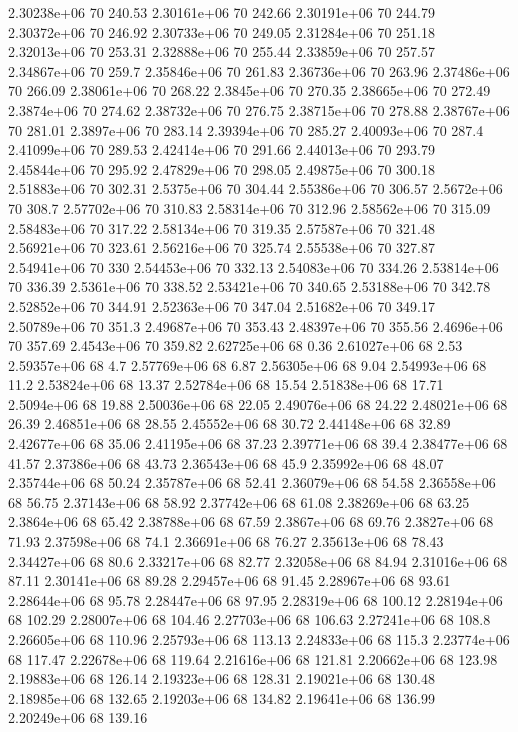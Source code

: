 2.30238e+06 70 240.53
2.30161e+06 70 242.66
2.30191e+06 70 244.79
2.30372e+06 70 246.92
2.30733e+06 70 249.05
2.31284e+06 70 251.18
2.32013e+06 70 253.31
2.32888e+06 70 255.44
2.33859e+06 70 257.57
2.34867e+06 70 259.7
2.35846e+06 70 261.83
2.36736e+06 70 263.96
2.37486e+06 70 266.09
2.38061e+06 70 268.22
2.3845e+06 70 270.35
2.38665e+06 70 272.49
2.3874e+06 70 274.62
2.38732e+06 70 276.75
2.38715e+06 70 278.88
2.38767e+06 70 281.01
2.3897e+06 70 283.14
2.39394e+06 70 285.27
2.40093e+06 70 287.4
2.41099e+06 70 289.53
2.42414e+06 70 291.66
2.44013e+06 70 293.79
2.45844e+06 70 295.92
2.47829e+06 70 298.05
2.49875e+06 70 300.18
2.51883e+06 70 302.31
2.5375e+06 70 304.44
2.55386e+06 70 306.57
2.5672e+06 70 308.7
2.57702e+06 70 310.83
2.58314e+06 70 312.96
2.58562e+06 70 315.09
2.58483e+06 70 317.22
2.58134e+06 70 319.35
2.57587e+06 70 321.48
2.56921e+06 70 323.61
2.56216e+06 70 325.74
2.55538e+06 70 327.87
2.54941e+06 70 330
2.54453e+06 70 332.13
2.54083e+06 70 334.26
2.53814e+06 70 336.39
2.5361e+06 70 338.52
2.53421e+06 70 340.65
2.53188e+06 70 342.78
2.52852e+06 70 344.91
2.52363e+06 70 347.04
2.51682e+06 70 349.17
2.50789e+06 70 351.3
2.49687e+06 70 353.43
2.48397e+06 70 355.56
2.4696e+06 70 357.69
2.4543e+06 70 359.82
2.62725e+06 68 0.36
2.61027e+06 68 2.53
2.59357e+06 68 4.7
2.57769e+06 68 6.87
2.56305e+06 68 9.04
2.54993e+06 68 11.2
2.53824e+06 68 13.37
2.52784e+06 68 15.54
2.51838e+06 68 17.71
2.5094e+06 68 19.88
2.50036e+06 68 22.05
2.49076e+06 68 24.22
2.48021e+06 68 26.39
2.46851e+06 68 28.55
2.45552e+06 68 30.72
2.44148e+06 68 32.89
2.42677e+06 68 35.06
2.41195e+06 68 37.23
2.39771e+06 68 39.4
2.38477e+06 68 41.57
2.37386e+06 68 43.73
2.36543e+06 68 45.9
2.35992e+06 68 48.07
2.35744e+06 68 50.24
2.35787e+06 68 52.41
2.36079e+06 68 54.58
2.36558e+06 68 56.75
2.37143e+06 68 58.92
2.37742e+06 68 61.08
2.38269e+06 68 63.25
2.3864e+06 68 65.42
2.38788e+06 68 67.59
2.3867e+06 68 69.76
2.3827e+06 68 71.93
2.37598e+06 68 74.1
2.36691e+06 68 76.27
2.35613e+06 68 78.43
2.34427e+06 68 80.6
2.33217e+06 68 82.77
2.32058e+06 68 84.94
2.31016e+06 68 87.11
2.30141e+06 68 89.28
2.29457e+06 68 91.45
2.28967e+06 68 93.61
2.28644e+06 68 95.78
2.28447e+06 68 97.95
2.28319e+06 68 100.12
2.28194e+06 68 102.29
2.28007e+06 68 104.46
2.27703e+06 68 106.63
2.27241e+06 68 108.8
2.26605e+06 68 110.96
2.25793e+06 68 113.13
2.24833e+06 68 115.3
2.23774e+06 68 117.47
2.22678e+06 68 119.64
2.21616e+06 68 121.81
2.20662e+06 68 123.98
2.19883e+06 68 126.14
2.19323e+06 68 128.31
2.19021e+06 68 130.48
2.18985e+06 68 132.65
2.19203e+06 68 134.82
2.19641e+06 68 136.99
2.20249e+06 68 139.16
